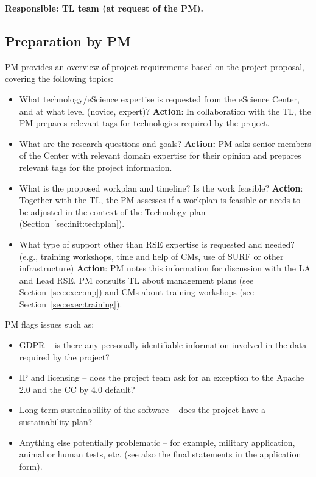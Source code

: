 \documentclass[11pt]{article}
\begin{document}
\textbf{Responsible: TL team (at request of the PM).}

\subsection{Preparation by PM}
PM provides an overview of project requirements based on the project proposal, covering the following topics:

\begin{itemize}
\item What technology/eScience expertise is requested from the eScience Center, and at what level (novice, expert)?
\textbf{Action}: In collaboration with the TL, the PM prepares relevant tags for technologies required by the project.
\item What are the research questions and goals? \textbf{Action:} PM asks senior members of the Center with relevant domain
expertise for their opinion and prepares relevant tags for the project information.
\item What is the proposed workplan and timeline? Is the work feasible? \textbf{Action}: Together with the TL, the PM assesses
if a workplan is feasible or needs to be adjusted in the context of the Technology plan (Section~\ref{sec:init:techplan}).
\item What type of support other than RSE expertise is requested and needed? (e.g., training workshops, time and help of CMs,
use of SURF or other infrastructure) \textbf{Action}: PM notes this information for discussion with the LA and Lead
RSE. PM consults TL about management plans (see Section~\ref{sec:exec:mp}) and CMs about training workshops (see
Section~\ref{sec:exec:training}).
\end{itemize}
PM flags issues such as:
\begin{itemize}
\item GDPR – is there any personally identifiable information involved in the data required by the project? 
\item IP and licensing – does the project team ask for an exception to the Apache 2.0 and the CC by 4.0 default? 
\item Long term sustainability of the software – does the project have a sustainability plan? 
\item Anything else potentially problematic – for example, military application, animal or human tests, etc. (see also the
final statements in the application form).
\end{itemize}
\end{document}
